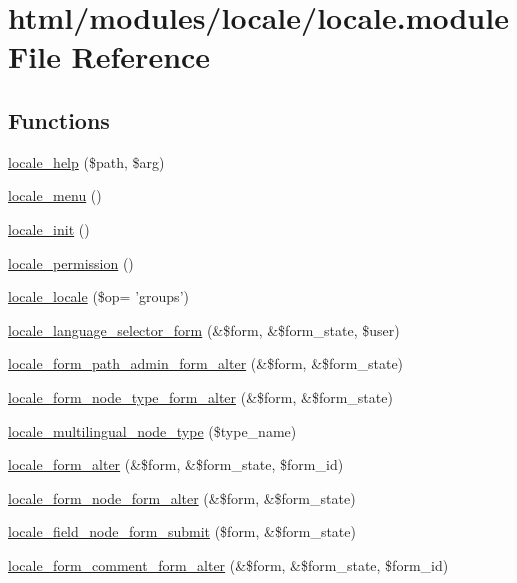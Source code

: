 \hypertarget{locale_8module}{
\section{html/modules/locale/locale.module File Reference}
\label{locale_8module}
}
\subsection*{Functions}
\begin{DoxyCompactItemize}
\item 
\hyperlink{locale_8module_ad8e900fa401bc78167a99d13f88ea797}{locale\_\-help} (\$path, \$arg)
\item 
\hyperlink{locale_8module_ad9b4de796140412563ad0aee2b051d3d}{locale\_\-menu} ()
\item 
\hyperlink{locale_8module_a93f28627ee01c5add57a18b298e23124}{locale\_\-init} ()
\item 
\hyperlink{locale_8module_a79b804afde34020d86a208737eb9adc9}{locale\_\-permission} ()
\item 
\hyperlink{locale_8module_ae83939a2d21f63a468411f16d58eab5c}{locale\_\-locale} (\$op= 'groups')
\item 
\hyperlink{group__forms_gaa40610c0086c0fadbca6db8b42d83236}{locale\_\-language\_\-selector\_\-form} (\&\$form, \&\$form\_\-state, \$user)
\item 
\hyperlink{locale_8module_aa97391a9803f665e0c9be02ce4d3b5dd}{locale\_\-form\_\-path\_\-admin\_\-form\_\-alter} (\&\$form, \&\$form\_\-state)
\item 
\hyperlink{locale_8module_a8dae6578c4a2c3bc70f60ec85e874161}{locale\_\-form\_\-node\_\-type\_\-form\_\-alter} (\&\$form, \&\$form\_\-state)
\item 
\hyperlink{locale_8module_a8acca52e1b0e4bcb4de55edee89e3922}{locale\_\-multilingual\_\-node\_\-type} (\$type\_\-name)
\item 
\hyperlink{locale_8module_a06e23e3ad26b4c81e48ecc15f538dd81}{locale\_\-form\_\-alter} (\&\$form, \&\$form\_\-state, \$form\_\-id)
\item 
\hyperlink{locale_8module_aa806a49c688743813db9cc4df8e3bc59}{locale\_\-form\_\-node\_\-form\_\-alter} (\&\$form, \&\$form\_\-state)
\item 
\hyperlink{locale_8module_a178a47bb849c82c0e9224956f0d3f7f3}{locale\_\-field\_\-node\_\-form\_\-submit} (\$form, \&\$form\_\-state)
\item 
\hyperlink{locale_8module_a0c89767f4334a1f943812abe06911fc8}{locale\_\-form\_\-comment\_\-form\_\-alter} (\&\$form, \&\$form\_\-state, \$form\_\-id)

\end{DoxyCompactItemize}
